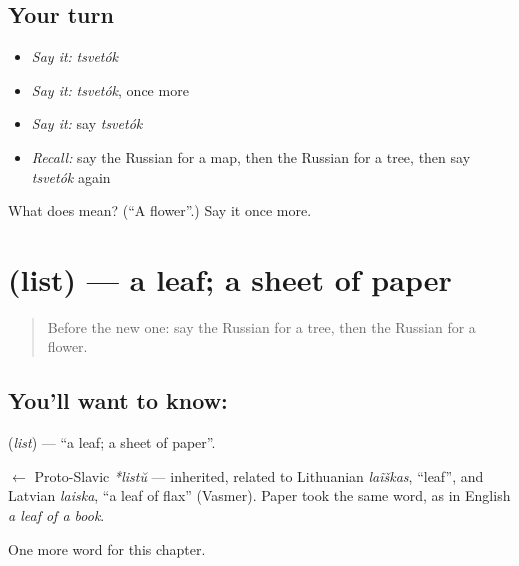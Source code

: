 \subsection*{Your turn}
\begin{itemize}
\raggedright
  \item \emph{Say it:} \emph{tsvetók}
  \item \emph{Say it:} \emph{tsvetók}, once more
  \item \emph{Say it:} say \emph{tsvetók}
  \item \emph{Recall:} say the Russian for a map, then the Russian for a tree, then say \emph{tsvetók} again
\end{itemize}

\begin{tcolorbox}[breakable,colback=teal!4,colframe=teal!35!black,title={Before you move on}]
What does  mean? (\textquotedblleft{}A flower\textquotedblright{}.) Say it once more.
\end{tcolorbox}
\section[\texorpdfstring{\ru{лист} (list)}{лист (list)}]{ (list) — a leaf; a sheet of paper}

\label{lesson:RU-C55-leaf}



\begin{quote}
Before the new one: say the Russian for a tree, then the Russian for a flower.
\end{quote}

\subsection*{You'll want to know: }
\textbf{} (\emph{list}) — \textquotedblleft{}a leaf; a sheet of paper\textquotedblright{}.

\begin{cousinweb}
\textbf{} $\leftarrow$ Proto-Slavic \emph{*listŭ} — inherited, related to Lithuanian \emph{laĩškas}, \textquotedblleft{}leaf\textquotedblright{}, and Latvian \emph{laiska}, \textquotedblleft{}a leaf of flax\textquotedblright{} (Vasmer). Paper took the same word, as in English \emph{a leaf of a book}.
\end{cousinweb}

\begin{grammarlens}[title={What you've built}]
One more word for this chapter.
\end{grammarlens}

